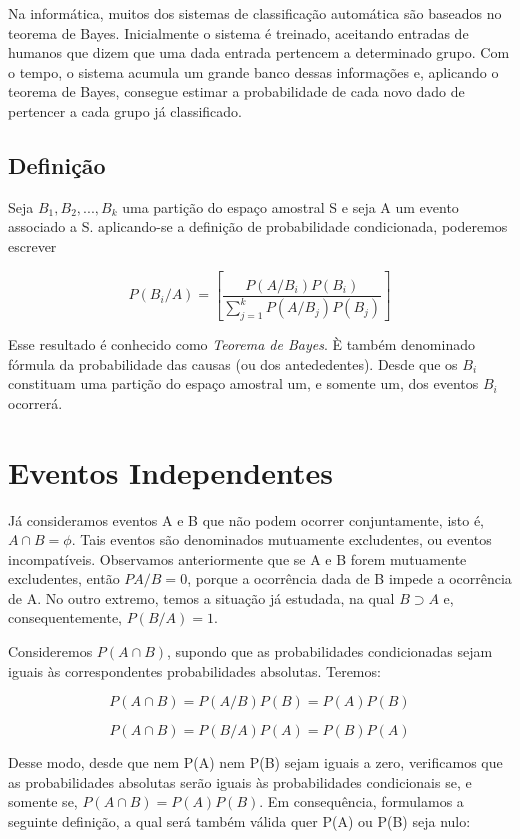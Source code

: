 Na informática, muitos dos sistemas de classificação automática
são baseados no teorema de Bayes. Inicialmente o sistema é
treinado, aceitando entradas de humanos que dizem que uma dada
entrada pertencem a determinado grupo. Com o tempo, o sistema
acumula um grande banco dessas informações e, aplicando o teorema
de Bayes, consegue estimar a probabilidade de cada novo dado de
pertencer a cada grupo já classificado.\vskip0.3cm


\subsection{Definição}

Seja $B_{1},B_{2},...,B_{k}$ uma partição do espaço amostral S e
seja A um evento associado a S. aplicando-se a definição de
probabilidade condicionada, poderemos escrever


\begin{equation}\label{bayes}
    P(B_{i}/A) =\left[ \frac{P(A/B_{i})P(B_{i})}{\sum_{j=1}^{k}P(A/B_{j})P(B_{j})} \right]
\end{equation}


Esse resultado é conhecido como \emph{Teorema de Bayes}. È também
denominado fórmula da probabilidade das causas (ou dos
antededentes). Desde que os $B_{i}$ constituam uma partição do
espaço amostral um, e somente um, dos eventos $B_{i}$ ocorrerá.

\section{Eventos Independentes}

Já consideramos eventos A e B que não podem ocorrer conjuntamente,
isto é, $A\cap B = \phi$. Tais eventos são denominados mutuamente
excludentes, ou eventos incompatíveis. Observamos anteriormente
que se A e B forem mutuamente excludentes, então $PA/B=0$, porque
a ocorrência dada de B impede a ocorrência de A. No outro extremo,
temos a situação já estudada, na qual $B \supset A$ e,
consequentemente, $P(B/A)=1$.\vskip0.3cm

Consideremos $P(A \cap B)$, supondo que as probabilidades
condicionadas sejam iguais às correspondentes probabilidades
absolutas. Teremos:

$$
P(A \cap B)= P(A/B)P(B)=P(A)P(B)
$$

$$
P(A \cap B)= P(B/A)P(A)=P(B)P(A)
$$


Desse modo, desde que nem P(A) nem P(B) sejam iguais a zero,
verificamos que as probabilidades absolutas serão iguais às
probabilidades condicionais se, e somente se, $P(A \cap
B)=P(A)P(B)$. Em consequência, formulamos a seguinte definição, a
qual será também válida quer P(A) ou P(B) seja nulo:\vskip0.3cm

